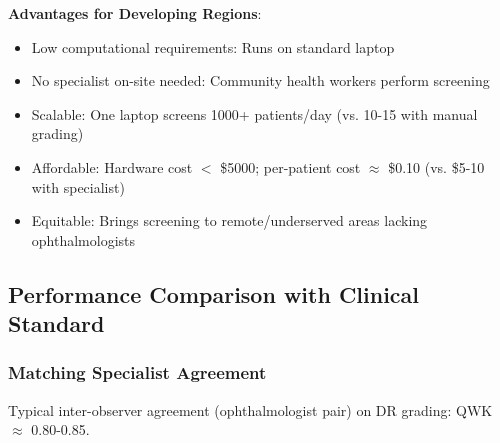 \documentclass[12pt,a4paper]{article}
\begin{document}
\begin{figure}[H]
\centering
{}
\end{figure}

\textbf{Advantages for Developing Regions}:
\begin{itemize}
    \item Low computational requirements: Runs on standard laptop
    \item No specialist on-site needed: Community health workers perform screening
    \item Scalable: One laptop screens 1000+ patients/day (vs. 10-15 with manual grading)
    \item Affordable: Hardware cost $<$ \$5000; per-patient cost $\approx$ \$0.10 (vs. \$5-10 with specialist)
    \item Equitable: Brings screening to remote/underserved areas lacking ophthalmologists
\end{itemize}

\subsection{Performance Comparison with Clinical Standard}

\subsubsection{Matching Specialist Agreement}

Typical inter-observer agreement (ophthalmologist pair) on DR grading: QWK $\approx$ 0.80-0.85.
\end{document}
